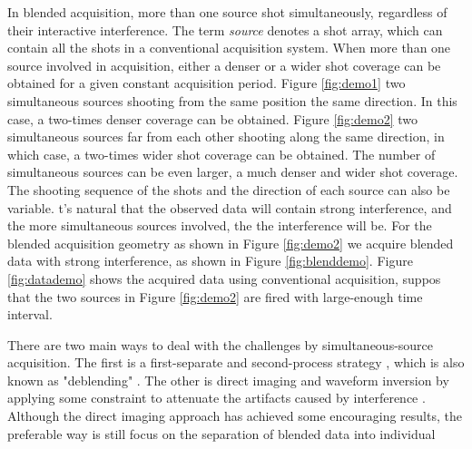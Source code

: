 In blended acquisition, more than one source  shot simultaneously, regardless of their interactive interference. The term \emph{source} denotes a shot array, which can contain all the shots in a conventional acquisition system. When more than one source  involved in acquisition, either a denser or a wider shot coverage can be obtained for a given constant acquisition period. Figure \ref{fig:demo1}  two simultaneous sources shooting from the same position  the same direction. In this case, a two-times denser coverage can be obtained. Figure \ref{fig:demo2}  two simultaneous sources far from each other shooting along the same direction, in which case, a two-times wider shot coverage can be obtained. The number of simultaneous sources can be even larger,  a much denser and wider shot coverage. The shooting sequence of the shots and the direction of each source can also be variable. t's natural\new{,} that the observed data will contain strong interference, and the more simultaneous sources involved, the  the interference will be. For the blended acquisition geometry as shown in Figure \ref{fig:demo2}\old{,} we  acquire  blended data\old{,} with strong interference, as shown in Figure \ref{fig:blenddemo}. Figure \ref{fig:datademo} shows the acquired data using conventional acquisition, suppos that the two sources in Figure \ref{fig:demo2} are fired with large-enough time interval.




There are two main ways to deal with the challenges  by simultaneous-source acquisition. The first  is   a first-separate and second-process strategy \cite[]{yangkang20131}, which is also known as "deblending" \cite[]{pana1}. The other is  direct imaging and waveform inversion by applying some constraint to attenuate the artifacts caused by interference \cite[]{verschuur2011,daiwei2012}. Although the direct imaging approach has achieved some encouraging results, the preferable way  is still  focus on the separation of blended data into individual  

